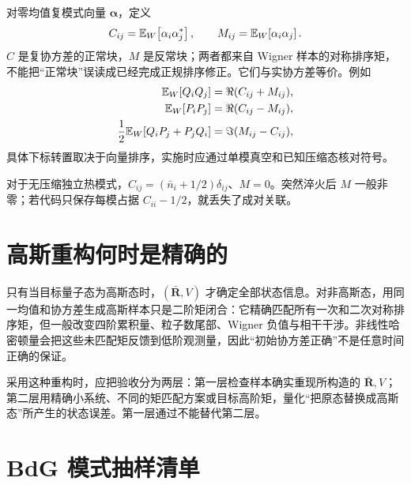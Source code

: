 对零均值复模式向量 $\bm\alpha$，定义
\begin{equation}
  C_{ij}=\mathbb{E}_{W}\!\left[\alpha_i\alpha_j^*\right],
  \qquad
  M_{ij}=\mathbb{E}_{W}\!\left[\alpha_i\alpha_j\right].
\end{equation}
$C$ 是复协方差的正常块，$M$ 是反常块；两者都来自 Wigner 样本的对称排序矩，不能把“正常块”误读成已经完成正规排序修正。它们与实协方差等价。例如
\begin{align}
  \mathbb{E}_{W}\!\left[Q_iQ_j\right]&=\Re(C_{ij}+M_{ij}),\\
  \mathbb{E}_{W}\!\left[P_iP_j\right]&=\Re(C_{ij}-M_{ij}),\\
  \frac12\mathbb{E}_{W}\!\left[Q_iP_j+P_jQ_i\right]&=\Im(M_{ij}-C_{ij}),
\end{align}
具体下标转置取决于向量排序，实施时应通过单模真空和已知压缩态核对符号。

对于无压缩独立热模式，$C_{ij}=(\bar n_i+1/2)\delta_{ij}$、$M=0$。突然淬火后 $M$ 一般非零；若代码只保存每模占据 $C_{ii}-1/2$，就丢失了成对关联。

\section{高斯重构何时是精确的}

只有当目标量子态为高斯态时，$(\bar{\bm R},V)$ 才确定全部状态信息。对非高斯态，用同一均值和协方差生成高斯样本只是二阶矩闭合：它精确匹配所有一次和二次对称排序矩，但一般改变四阶累积量、粒子数尾部、Wigner 负值与相干干涉。非线性哈密顿量会把这些未匹配矩反馈到低阶观测量，因此“初始协方差正确”不是任意时间正确的保证。

采用这种重构时，应把验收分为两层：第一层检查样本确实重现所构造的 $\bar{\bm R},V$；第二层用精确小系统、不同的矩匹配方案或目标高阶矩，量化“把原态替换成高斯态”所产生的状态误差。第一层通过不能替代第二层。

\section{BdG 模式抽样清单}

